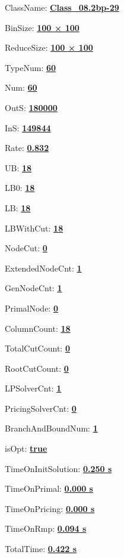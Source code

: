 \documentclass[11pt]{article}
\begin{document}
\pagestyle{empty}


ClassName: \underline{\textbf{Class_08.2bp-29}}
\par
BinSize: \underline{\textbf{100 × 100}}
\par
ReduceSize: \underline{\textbf{100 × 100}}
\par
TypeNum: \underline{\textbf{60}}
\par
Num: \underline{\textbf{60}}
\par
OutS: \underline{\textbf{180000}}
\par
InS: \underline{\textbf{149844}}
\par
Rate: \underline{\textbf{0.832}}
\par
UB: \underline{\textbf{18}}
\par
LB0: \underline{\textbf{18}}
\par
LB: \underline{\textbf{18}}
\par
LBWithCut: \underline{\textbf{18}}
\par
NodeCut: \underline{\textbf{0}}
\par
ExtendedNodeCnt: \underline{\textbf{1}}
\par
GenNodeCnt: \underline{\textbf{1}}
\par
PrimalNode: \underline{\textbf{0}}
\par
ColumnCount: \underline{\textbf{18}}
\par
TotalCutCount: \underline{\textbf{0}}
\par
RootCutCount: \underline{\textbf{0}}
\par
LPSolverCnt: \underline{\textbf{1}}
\par
PricingSolverCnt: \underline{\textbf{0}}
\par
BranchAndBoundNum: \underline{\textbf{1}}
\par
isOpt: \underline{\textbf{true}}
\par
TimeOnInitSolution: \underline{\textbf{0.250 s}}
\par
TimeOnPrimal: \underline{\textbf{0.000 s}}
\par
TimeOnPricing: \underline{\textbf{0.000 s}}
\par
TimeOnRmp: \underline{\textbf{0.094 s}}
\par
TotalTime: \underline{\textbf{0.422 s}}
\par
\newpage


\end{document}
